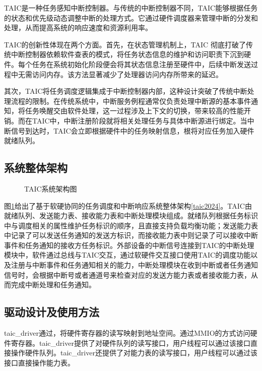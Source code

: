 TAIC是一种任务感知中断控制器。与传统的中断控制器不同，TAIC能够根据任务的状态和优先级动态调整中断的处理方式。它通过硬件调度器来管理中断的分发和处理，从而提高系统的响应速度和资源利用率。

TAIC的创新性体现在两个方面。首先，在状态管理机制上，TAIC 彻底打破了传统中断控制器依赖软件查表的模式，将任务状态信息的维护和访问职责下沉到硬件。每个任务在系统初始化阶段便会将其状态信息注册至硬件中，后续中断发送过程中无需访问内存。该方法显著减少了处理器访问内存所带来的延迟。

其次，TAIC将任务调度逻辑集成于中断控制器内部，这种设计突破了传统中断处理流程的限制。在传统系统中，中断服务例程通常仅负责处理中断源的基本事件通知，将任务唤醒交由软件处理，这一过程涉及上下文的切换，带来较高的性能开销。而在TAIC中，中断注册阶段就将相关处理任务与具体中断源进行绑定。当中断信号到达时，TAIC会立即根据硬件中的任务映射信息，根将对应任务加入硬件就绪队列。

\subsection{系统整体架构}

\begin{figure}[htbp]
    \centering
    
    \caption{TAIC系统架构图}\label{taicarch}
\end{figure}

图\ref{taicarch}给出了基于软硬协同的任务调度和中断响应系统整体架构\ref{taic2024}。TAIC由就绪队列、发送能力表、接收能力表和中断处理模块组成。就绪队列根据任务标识中与调度相关的属性维护任务标识的顺序，且直接支持负载均衡功能；发送能力表中记录了可以发送任务通知的发送方标识，而接收能力表中则记录了可以接收中断事件和任务通知的接收方任务标识。外部设备的中断信号连接到TAIC的中断处理模块中，软件通过总线与TAIC交互，通过软硬件交互接口使用TAIC的调度功能以及注册与中断事件和任务通知相关的能力，中断处理模块在收到中断或者任务通知信号时，会根据中断号或者通道号来检查对应的发送方能力表或者接收能力表，从而完成中断处理和任务通知。

\subsection{驱动设计及使用方法}\label{sec:taicdriver}

taic\_driver通过，将硬件寄存器的读写映射到地址空间。通过MMIO的方式访问硬件寄存器。taic\_driver提供了对硬件队列的读写接口，用户线程可以通过该接口直接操作硬件队列。taic\_driver还提供了对能力表的读写接口，用户线程可以通过该接口直接操作能力表。

